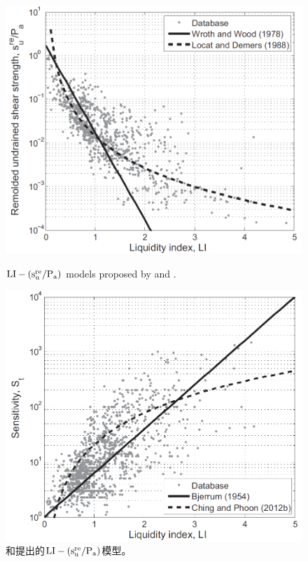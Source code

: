 \begin{figure}[!p]
    \centering
    \begin{minipage}[t]{0.48\textwidth}
        \centering
        \includegraphics[width=\textwidth]{figures/figure-2.png}
        \caption{$\rm{LI}-(s_u^{re}/P_a)$ models proposed by \citet{Wroth1978137} and \citet{Locat1988799}.}
        \vspace{-5pt}
        \addtocounter{figure}{-1}
        \renewcommand{\figurename}{图}
        \caption{\citet{Wroth1978137}和\citet{Locat1988799}提出的$\rm{LI}-(s_u^{re}/P_a)$模型。}
        \label{figure:2}
        \renewcommand{\figurename}{Figure}
    \end{minipage}
    \begin{minipage}[t]{0.48\textwidth}
        \centering
        \includegraphics[width=\textwidth]{figures/figure-3.png}

\end{minipage}
\end{figure}
